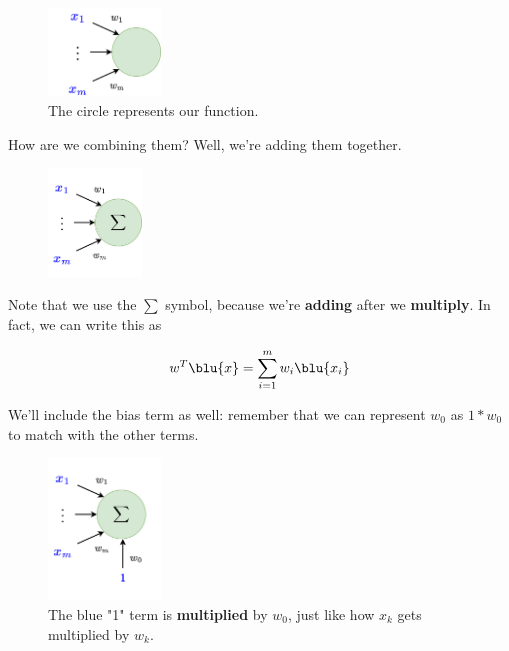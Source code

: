         
        \begin{figure}[H]
            \centering
            \includegraphics[width=30mm,scale=0.4]{images/nn_images/weights.png}
            \caption*{The circle represents our function.}
        \end{figure}
        
        How are we combining them? Well, we're adding them together.
        
        \begin{figure}[H]
            \centering
            \includegraphics[width=25mm,scale=0.4]{images/nn_images/sigma.png}
        \end{figure}
        
        Note that we use the $\sum$ symbol, because we're \textbf{adding} after we \textbf{multiply}. In fact, we can write this as
        
        \begin{equation}
            w^T \blu{x} = \sum_{i=1}^m w_i\blu{x_i}
        \end{equation}
        
        We'll include the bias term as well: remember that we can represent $w_0$ as $1 * w_0$ to match with the other terms.
        
        \begin{figure}[H]
            \centering
            \includegraphics[width=30mm,scale=0.4]{images/nn_images/bias.png}
            \caption*{The blue "1" term is \textbf{multiplied} by $w_0$, just like how $x_k$ gets multiplied by $w_k$.}
        \end{figure}
        
